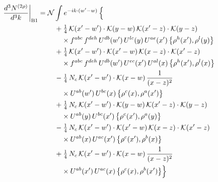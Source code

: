 \documentclass[10pt]{article}
\numberwithin{equation}{section}
\newcommand{\KK}{\mathcal K}
\newcommand{\NN}{\mathcal N}
\begin{document}
\begin{align}
\frac{d^3N^{(2\rho)}}{d^3k}\bigg|_{\rm B1}={}&\NN\int e^{-ik\cdot(w'-w)}\,\Big\{\notag\\
&\quad +\tfrac14\,\KK(x'-w')\cdot\KK(y-w)\,\KK(x'-z)\cdot\KK(y-z)\notag\\
&\qquad\times f^{abc}\,f^{deh}\,U^{db}(w')\,U^{lc}(y)\,U^{ae}(x')\,\big\{\rho^{h}(x'),\rho^{l}(y)\big\}\notag\\
&\quad +\tfrac14\,\KK(x'-w')\cdot\KK(x'-w)\,\KK(x-z)\cdot\KK(x'-z)\notag\\
&\qquad\times f^{abc}\,f^{deh}\,U^{db}(w')\,U^{ec}(x')\,U^{al}(x)\,\big\{\rho^{h}(x'),\rho^{l}(x)\big\}\notag\\
&\quad -\tfrac14\,N_{c}\,\KK(x'-w')\cdot\KK(x-w)\,\frac{1}{(x-z)^2}\notag\\
&\qquad\times U^{ab}(w')\,U^{bc}(x)\,\big\{\rho^{c}(x),\rho^{a}(x')\big\}\notag\\
&\quad +\tfrac14\,N_{c}\,\KK(x'-w')\cdot\KK(y-w)\,\KK(x'-z)\cdot\KK(y-z)\notag\\
&\qquad\times U^{ab}(y)\,U^{bc}(x')\,\big\{\rho^{c}(x'),\rho^{a}(y)\big\}\notag\\
&\quad -\tfrac14\,N_{c}\,\KK(x'-w')\cdot\KK(x'-w)\,\KK(x-z)\cdot\KK(x'-z)\notag\\
&\qquad\times U^{ab}(x)\,U^{ac}(x')\,\big\{\rho^{c}(x'),\rho^{b}(x)\big\}\notag\\
&\quad +\tfrac14\,N_{c}\,\KK(x'-w')\cdot\KK(x-w)\,\frac{1}{(x-z)^2}\notag\\
&\qquad\times U^{ab}(x')\,U^{ac}(x)\,\big\{\rho^{c}(x),\rho^{b}(x')\big\}\Big\}\label{eq:sum-B1}
\end{align}
\end{document}

